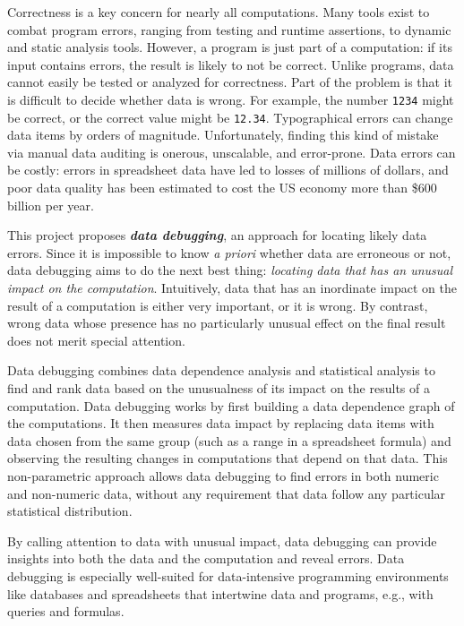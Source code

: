\projectname{}

Correctness is a key concern for nearly all computations. Many tools
exist to combat program errors, ranging from testing and runtime
assertions, to dynamic and static analysis tools. However, a program
is just part of a computation: if its input contains errors, the
result is likely to not be correct. Unlike programs, data cannot
easily be tested or analyzed for correctness.  Part of the problem is
that it is difficult to decide whether data is wrong. For example, the
number \texttt{1234} might be correct, or the correct value might
be \texttt{12.34}. Typographical errors can change data items by
orders of magnitude. Unfortunately, finding this kind of mistake via
manual data auditing is onerous, unscalable, and error-prone. Data
errors can be costly: errors in spreadsheet data have led to losses of
millions of dollars, and poor data quality has been estimated to cost
the US economy more than \$600 billion per year.

This project proposes \emph{\bf data debugging}, an approach for
locating likely data errors. Since it is impossible to know \emph{a
priori} whether data are erroneous or not, data debugging aims to do
the next best thing: \emph{locating data that has an unusual impact on
the computation}. Intuitively, data that has an inordinate impact on
the result of a computation is either very important, or it is wrong. By
contrast, wrong data whose presence has no particularly unusual effect
on the final result does not merit special attention.

Data debugging combines data dependence analysis and statistical
analysis to find and rank data based on the unusualness of its impact
on the results of a computation. Data debugging works by first
building a data dependence graph of the computations. It then measures
data impact by replacing data items with data chosen from the same
group (such as a range in a spreadsheet formula) and observing the
resulting changes in computations that depend on that data. This
non-parametric approach allows data debugging to find errors in both
numeric and non-numeric data, without any requirement that data follow
any particular statistical distribution.

By calling attention to data with unusual impact, data debugging can
provide insights into both the data and the computation and reveal
errors. Data debugging is especially well-suited for data-intensive
programming environments like databases and spreadsheets that
intertwine data and programs, e.g., with queries and formulas.

